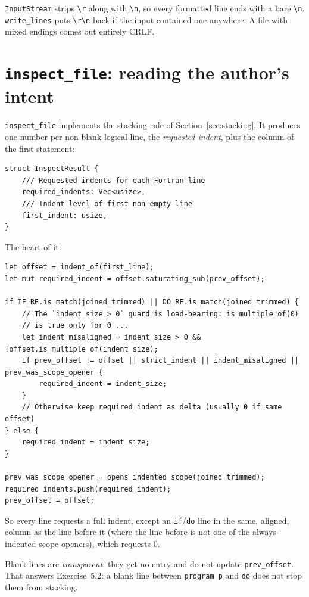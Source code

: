 \documentclass[11pt,a4paper,openany]{book}
\newcommand{\code}[1]{\texttt{\small #1}}
\begin{document}
\code{InputStream} strips \code{\textbackslash r} along with
\code{\textbackslash n}, so every formatted line ends with a bare
\code{\textbackslash n}. \code{write\_lines} puts \code{\textbackslash r\textbackslash n} back if the
input contained one anywhere. A file with mixed endings comes out entirely
CRLF.

\section{\texttt{inspect\_file}: reading the author's intent}\label{sec:inspect}

\code{inspect\_file} implements the stacking rule of
Section~\ref{sec:stacking}. It produces one number per non-blank logical line,
the \emph{requested indent}, plus the column of the first statement:

\begin{lstlisting}[style=rust]
struct InspectResult {
    /// Requested indents for each Fortran line
    required_indents: Vec<usize>,
    /// Indent level of first non-empty line
    first_indent: usize,
}
\end{lstlisting}

The heart of it:

\begin{lstlisting}[style=rust]
let offset = indent_of(first_line);
let mut required_indent = offset.saturating_sub(prev_offset);

if IF_RE.is_match(joined_trimmed) || DO_RE.is_match(joined_trimmed) {
    // The `indent_size > 0` guard is load-bearing: is_multiple_of(0)
    // is true only for 0 ...
    let indent_misaligned = indent_size > 0 && !offset.is_multiple_of(indent_size);
    if prev_offset != offset || strict_indent || indent_misaligned || prev_was_scope_opener {
        required_indent = indent_size;
    }
    // Otherwise keep required_indent as delta (usually 0 if same offset)
} else {
    required_indent = indent_size;
}

prev_was_scope_opener = opens_indented_scope(joined_trimmed);
required_indents.push(required_indent);
prev_offset = offset;
\end{lstlisting}

So every line requests a full indent, except an \code{if}/\code{do} line in
the same, aligned, column as the line before it (where the line before is not
one of the always-indented scope openers), which requests 0.

Blank lines are \emph{transparent}: they get no entry and do not update
\code{prev\_offset}. That answers Exercise~5.2: a blank line between
\code{program p} and \code{do} does not stop them from stacking.
\end{document}
